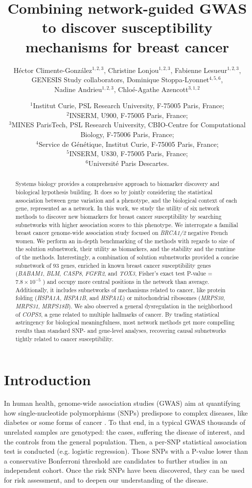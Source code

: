 \documentclass[twocolumn, 11pt, draft]{article}
\title{Combining network-guided GWAS to discover susceptibility mechanisms for breast cancer}
\author{Héctor Climente-González$^{1,2,3}$, Christine Lonjou$^{1,2,3}$, Fabienne Lesueur$^{1,2,3}$, \\
GENESIS Study collaborators, Dominique Stoppa-Lyonnet$^{4,5,6}$, \\
Nadine Andrieu$^{1,2,3}$, Chloé-Agathe Azencott$^{3,1,2}$}
\date{$^{1}$Institut Curie, PSL Research University, F-75005 Paris, France;\\
  $^{2}$INSERM, U900, F-75005 Paris, France;\\
  $^{3}$MINES ParisTech, PSL Research University, CBIO-Centre for Computational Biology, F-75006 Paris, France;\\
  $^{4}$Service de Génétique, Institut Curie, F-75005 Paris, France;\\
  $^{5}$INSERM, U830, F-75005 Paris, France;\\
  $^{6}$Université Paris Descartes.\\
}
\begin{document}
\onecolumn
\maketitle

\begin{abstract}
Systems biology provides a comprehensive approach to biomarker discovery and biological hypothesis building. It does so by jointly considering the statistical association between gene variation and a phenotype, and the biological context of each gene, represented as a network. In this work, we study the utility of six network methods to discover new biomarkers for breast cancer susceptibility by searching subnetworks with higher association scores to this phenotype. We interrogate a familial breast cancer genome-wide association study focused on \emph{BRCA1/2} negative French women. We perform an in-depth benchmarking of the methods with regards to size of the solution subnetwork, their utility as biomarkers, and the stability and the runtime of the methods. Interestingly, a combination of solution subnetworks provided a concise subnetwork of 93 genes, enriched in known breast cancer susceptibility genes (\emph{BABAM1}, \emph{BLM}, \emph{CASP8}, \emph{FGFR2}, and \emph{TOX3}, Fisher's exact test P-value = $7.8 \times 10^{-5}$ ) and occupy more central positions in the network than average. Additionally, it includes subnetworks of mechanisms related to cancer, like protein folding (\emph{HSPA1A}, \emph{HSPA1B}, and \emph{HSPA1L}) or mitochondrial ribosomes (\emph{MRPS30}, \emph{MRPS31}, \emph{MRPS18B}). We also observed a general dysregulation in the neighborhood of \emph{COPS5}, a gene related to multiple hallmarks of cancer. By trading statistical astringency for biological meaningfulness, most network methods get more compelling results than standard SNP- and gene-level analyses, recovering causal subnetworks tightly related to cancer susceptibility. 
\end{abstract}

\section{Introduction}

In human health, genome-wide association studies (GWAS) aim at quantifying how single-nucleotide polymorphisms (SNPs) predispose to complex diseases, like diabetes or some forms of cancer \cite{bush_chapter_2012}. To that end, in a typical GWAS thousands of unrelated samples are genotyped: the cases, suffering the disease of interest, and the controls from the general population. Then, a per-SNP statistical association test is conducted (e.g. logistic regression). Those SNPs with a P-value lower than a conservative Bonferroni threshold are candidates to further studies in an independent cohort. Once the risk SNPs have been discovered, they can be used for risk assessment, and to deepen our understanding of the disease.
\end{document}
